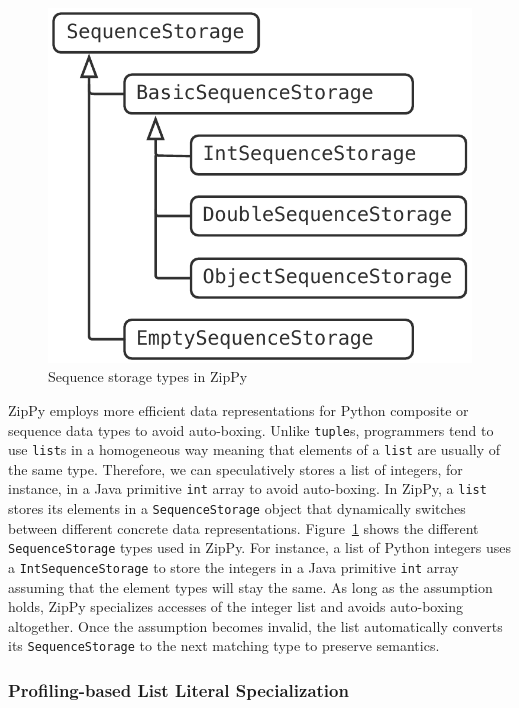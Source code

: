 \begin{figure}[ht]
\centering
\includegraphics[scale=.5]{figures/ch3-sequence-storage-types.pdf}
\caption{Sequence storage types in ZipPy}
\label{fig:sequence-storage-types}
\end{figure}

ZipPy employs more efficient data representations for Python composite or sequence data types to avoid auto-boxing.
Unlike \texttt{tuple}s, programmers tend to use \texttt{list}s in a homogeneous way meaning that elements of a \texttt{list} are usually of the same type.
Therefore, we can speculatively stores a list of integers, for instance, in a Java primitive \texttt{int} array to avoid auto-boxing.
In ZipPy, a \texttt{list} stores its elements in a \texttt{SequenceStorage} object that dynamically switches between different concrete data representations.
Figure~\ref{fig:sequence-storage-types} shows the different \texttt{SequenceStorage} types used in ZipPy.
For instance, a list of Python integers uses a \texttt{IntSequenceStorage} to store the integers in a Java primitive \texttt{int} array assuming that the element types will stay the same.
As long as the assumption holds, ZipPy specializes accesses of the integer list and avoids auto-boxing altogether.
Once the assumption becomes invalid, the list automatically converts its \texttt{SequenceStorage} to the next matching type to preserve semantics.

\subsubsection{Profiling-based List Literal Specialization}

